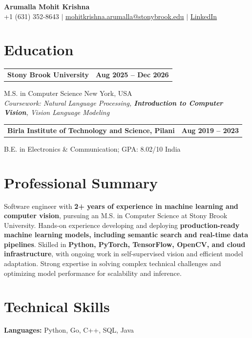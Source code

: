 \documentclass[letterpaper,10pt]{article}
\makeatletter
\newcommand{\entry}[2]{%
  \noindent
  \begin{tabularx}{\linewidth}
    {@{}>{\raggedright\arraybackslash}X@{\hspace{6pt}}r@{}}
    \textbf{#1} & #2
  \end{tabularx}\par
}
\makeatother
\begin{document}
\begin{center}
    {\LARGE\bfseries Arumalla Mohit Krishna}\\[3pt]
    +1 (631) 352-8643 $|$
    \href{mailto:mohitkrishna.arumalla@stonybrook.edu}
    {mohitkrishna.arumalla@stonybrook.edu} $|$
    \href{https://linkedin.com/in/mohit-krishna-arumalla}
    {LinkedIn}
\end{center}
\vspace{-8pt}

\section{Education}

\entry
  {\textbf{Stony Brook University}}
  {\textbf{Aug 2025 -- Dec 2026}}

M.S. in Computer Science \hfill New York, USA\\
\textit{
Coursework: Natural Language Processing,
\textbf{Introduction to Computer Vision}, Vision Language Modeling
}
\vspace{3pt}

\entry
  {\textbf{Birla Institute of Technology and Science, Pilani}}
  {\textbf{Aug 2019 -- 2023}}

B.E. in Electronics \& Communication; GPA: 8.02/10 \hfill India
\section{Professional Summary}

Software engineer with \textbf{2+ years of experience in machine learning and computer vision}, pursuing an M.S. in Computer Science at Stony Brook University. Hands-on experience developing and deploying \textbf{production-ready machine learning models, including semantic search and real-time data pipelines}. Skilled in \textbf{Python, PyTorch, TensorFlow, OpenCV, and cloud infrastructure}, with ongoing work in self-supervised vision and efficient model adaptation. Strong expertise in solving complex technical challenges and optimizing model performance for scalability and inference.

\section{Technical Skills}

\textbf{Languages:}
Python, Go, C++, SQL, Java\\
\end{document}
